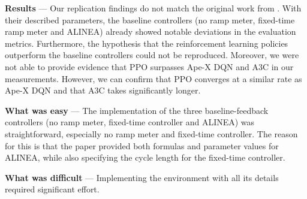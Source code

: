 \vspace{1em}

\textbf{Results} --- 
Our replication findings do not match the original work from \cite{hou2021rampmeter}. With their described parameters, the baseline controllers (no ramp meter, fixed-time ramp meter and ALINEA)
already showed notable deviations in the evaluation metrics. Furthermore, the hypothesis that the reinforcement learning policies outperform the baseline controllers could not be reproduced. 
Moreover, we were not able to provide evidence that PPO surpasses Ape-X DQN and A3C in our measurements. However, we can confirm that PPO converges at a similar rate as Ape-X DQN and that A3C takes significantly longer.  


\vspace{1em}

\textbf{What was easy} --- 
The implementation of the three baseline-feedback controllers (no ramp meter, fixed-time controller and ALINEA) was straightforward, especially no ramp meter and fixed-time controller. 
The reason for this is that the paper provided both formulas and parameter values for ALINEA, while also specifying the cycle length for the fixed-time controller. 

\vspace{1em}

\textbf{What was difficult} --- 
Implementing the environment with all its details required significant effort. 
